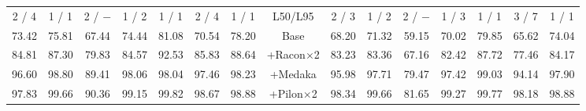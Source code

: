 \documentclass[a4paper,num-refs]{oup-contemporary}
\begin{document}
\begin{table}[t!]
\begin{tabular}{ccccccc|cc|ccccccc}
2 / 4   &       1 / 1   &       2 / $-$ &       1 / 2   &       1 / 1   &       2 / 4   &       1 / 1   &       \multicolumn{2}{c|}{L50/L95}    &       2 / 3   &       1 / 2   &       2 / $-$ &       1 / 3   &       1 / 1   &       3 / 7   &       1 / 1\\
73.42   &       75.81   &       67.44   &       74.44   &       81.08   &       70.54   &       78.20   &       \multicolumn{2}{c|}{Base}       &       68.20   &       71.32   &       59.15   &       70.02   &       79.85   &       65.62   &       74.04\\
84.81   &       87.30   &       79.83   &       84.57   &       92.53   &       85.83   &       88.64   &       \multicolumn{2}{c|}{+Racon$\times$2}    &       83.23   &       83.36   &       67.16   &       82.42   &       87.72   &       77.46   &       84.17\\
96.60   &       98.80   &       89.41   &       98.06   &       98.04   &       97.46   &       98.23   &       \multicolumn{2}{c|}{+Medaka}    &       95.98   &       97.71   &       79.47   &       97.42   &       99.03   &       94.14   &       97.90\\
97.83   &       99.66   &       90.36   &       99.15   &       99.82   &       98.67   &       98.88   &       \multicolumn{2}{c|}{+Pilon$\times$2}    &       98.34   &       99.66   &       81.65   &       99.27   &       99.77   &       98.18   &       98.88\\
\midrule

\end{tabular}
\end{table}
\end{document}
